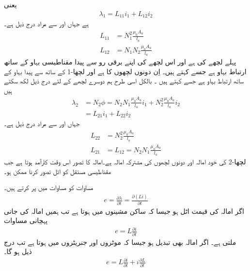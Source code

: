 یعنی
\begin{align}\label{مساوات_مقناطیسی_دور_ارتباط_دو_لچھے}
\lambda_1 = L_{11} i_1+L_{12} i_2
\end{align}
ہے جہاں  اور  سے مراد درج ذیل ہے۔
\begin{align}
L_{11}&=N_1^2  \frac{\mu_0 A_a}{l_a}\\
L_{12}&=N_1 N_2  \frac{\mu_0 A_a}{l_a}
\end{align}
 پہلے لچھے کی    ہے اور   اس لچھے کی اپنے برقی رو  سے پیدا مقناطیسی بہاو  کے ساتھ  ارتباط بہاو ہے جسے  کہتے ہیں۔  اِن دونوں لچھوں  کا   ہے اور    لچھا-1  کے ساتھ   سے پیدا بہاو کے ساتھ  ارتباط بہاو  ہے جسے   کہتے ہیں ۔ بالکل اسی طرح ہم دوسرے لچھے کے لئے درج ذیل لکھ سکتے ہیں
\begin{align}
\lambda_2&=N_2 \phi=N_2 N_1 \frac{\mu_0 A_a}{l_a} i_1+N_2^2 \frac{\mu_0 A_a}{l_a} i_2  \nonumber \\
&=L_{21} i_1+L_{22} i_2 \label{مساوات_مقناطیسی_دور_دوسرے_لچھے_کی_ارتباط}
\end{align}
جہاں  اور  سے مراد درج ذیل ہے۔
\begin{align}
L_{22}&=N_2^2 \frac{\mu_0 A_a}{l_a}\\
L_{21}&=L_{12}=N_2 N_1 \frac{\mu_0 A_a}{l_a} \label{مساوات_مقناطیسی_دور_مشترکہ_امالہ_یکساں}
\end{align}
 لچھا-2  کی خود امالہ اور   دونوں لچھوں کی مشترکہ امالہ ہے۔امالہ کا تصور اس وقت کارآمد ہوتا ہے جب مقناطیسی مستقل   کو اٹل تصور کرنا ممکن ہو۔

مساوات   کو مساوات   میں پر کرتے ہیں۔
\begin{align}
e=\frac{\partial \lambda}{\partial t}=\frac{\partial \left( L i\right) }{\partial t}
\end{align}
اگر امالہ کی قیمت اٹل ہو جیسا کہ ساکن مشینوں  میں ہوتا ہے تب ہمیں  امالہ کی جانی پہچانی مساوات
\begin{align}
e=L \frac{\partial i}{\partial t}
\end{align}
ملتی ہے۔ اگر امالہ بھی تبدیل ہو جیسا کہ موٹروں اور جنریٹروں میں ہوتا ہے تب درج ذیل ہو گا۔
\begin{align}
e= L \frac{\partial i}{\partial t} + i \frac{\partial L}{\partial t}
\end{align}

